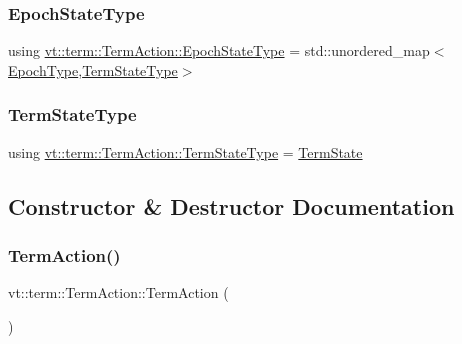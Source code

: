 \mbox{\label{structvt_1_1term_1_1_term_action_afcbc07a9b40ff2b6d53e9522877a745d}} 
\subsubsection{\texorpdfstring{Epoch\+State\+Type}{EpochStateType}}
{\footnotesize\ttfamily using \hyperlink{structvt_1_1term_1_1_term_action_afcbc07a9b40ff2b6d53e9522877a745d}{vt\+::term\+::\+Term\+Action\+::\+Epoch\+State\+Type} =  std\+::unordered\+\_\+map$<$\hyperlink{namespacevt_a81d11b28122d43bf9834577e4a06440f}{Epoch\+Type},\hyperlink{structvt_1_1term_1_1_term_action_ae4c635b69751d887666814700ed64d65}{Term\+State\+Type}$>$}

\mbox{\label{structvt_1_1term_1_1_term_action_ae4c635b69751d887666814700ed64d65}} 
\subsubsection{\texorpdfstring{Term\+State\+Type}{TermStateType}}
{\footnotesize\ttfamily using \hyperlink{structvt_1_1term_1_1_term_action_ae4c635b69751d887666814700ed64d65}{vt\+::term\+::\+Term\+Action\+::\+Term\+State\+Type} =  \hyperlink{structvt_1_1term_1_1_term_state}{Term\+State}}



\subsection{Constructor \& Destructor Documentation}
\mbox{\label{structvt_1_1term_1_1_term_action_ac0b0f4271452cfbea674c6a7c4f50a4b}} 
\subsubsection{\texorpdfstring{Term\+Action()}{TermAction()}}
{\footnotesize\ttfamily vt\+::term\+::\+Term\+Action\+::\+Term\+Action (\begin{DoxyParamCaption}{ }\end{DoxyParamCaption})\hspace{0.3cm}{\ttfamily [default]}}

